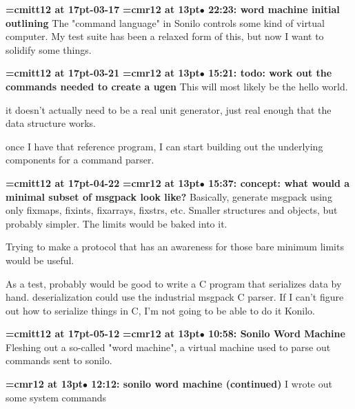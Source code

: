{\medskip\noindent\bf\font\titlefont=cmitt12 at 17pt-03-17}\medskip
{\smallskip\noindent\bf\font\titlefont=cmr12 at 13pt\titlefont $\bullet$ 22:23: word machine initial outlining}\smallskip
The "command language" in Sonilo controls some kind of virtual computer. My test suite has been a relaxed form of this, but now I want to solidify some things.
\par

{\medskip\noindent\bf\font\titlefont=cmitt12 at 17pt-03-21}\medskip
{\smallskip\noindent\bf\font\titlefont=cmr12 at 13pt\titlefont $\bullet$ 15:21: todo: work out the commands needed to create a ugen}\smallskip
This will most likely be the hello world.
\par

it doesn't actually need to be a real unit generator, just real enough that the data structure works.
\par

once I have that reference program, I can start building out the underlying components for a command parser.
\par

{\medskip\noindent\bf\font\titlefont=cmitt12 at 17pt-04-22}\medskip
{\smallskip\noindent\bf\font\titlefont=cmr12 at 13pt\titlefont $\bullet$ 15:37: concept: what would a minimal subset of msgpack look like?}\smallskip
Basically, generate msgpack using only fixmaps, fixints, fixarrays, fixstrs, etc. Smaller structures and objects, but probably simpler. The limits would be baked into it.
\par

Trying to make a protocol that has an awareness for those bare minimum limits would be useful.
\par

As a test, probably would be good to write a C program that serializes data by hand. deserialization could use the industrial msgpack C parser. If I can't figure out how to serialize things in C, I'm not going to be able to do it Konilo.
\par

{\medskip\noindent\bf\font\titlefont=cmitt12 at 17pt-05-12}\medskip
{\smallskip\noindent\bf\font\titlefont=cmr12 at 13pt\titlefont $\bullet$ 10:58: Sonilo Word Machine}\smallskip
Fleshing out a so-called "word machine", a virtual machine used to parse out commands sent to sonilo.
\par

{\smallskip\noindent\bf\font\titlefont=cmr12 at 13pt\titlefont $\bullet$ 12:12: sonilo word machine (continued)}\smallskip
I wrote out some system commands
\par

